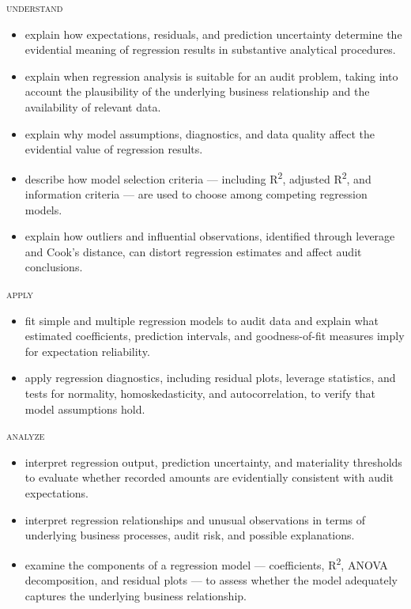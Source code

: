 \noindent \textsc{understand}
\begin{itemize}

\item explain how expectations, residuals, and prediction uncertainty determine the evidential meaning of regression results in substantive analytical procedures.
\item explain when regression analysis is suitable for an audit problem, taking into account the plausibility of the underlying business relationship and the availability of relevant data.
\item explain why model assumptions, diagnostics, and data quality affect the evidential value of regression results.
\item describe how model selection criteria --- including R\textsuperscript{2}, adjusted R\textsuperscript{2}, and information criteria --- are used to choose among competing regression models.
\item explain how outliers and influential observations, identified through leverage and Cook's distance, can distort regression estimates and affect audit conclusions.
\end{itemize}

\noindent \textsc{apply}
\begin{itemize}

\item fit simple and multiple regression models to audit data and explain what estimated coefficients, prediction intervals, and goodness-of-fit measures imply for expectation reliability.
\item apply regression diagnostics, including residual plots, leverage statistics, and tests for normality, homoskedasticity, and autocorrelation, to verify that model assumptions hold.
\end{itemize}

\noindent \textsc{analyze}
\begin{itemize}

\item interpret regression output, prediction uncertainty, and materiality thresholds to evaluate whether recorded amounts are evidentially consistent with audit expectations.
\item interpret regression relationships and unusual observations in terms of underlying business processes, audit risk, and possible explanations.
\item examine the components of a regression model --- coefficients, R\textsuperscript{2}, ANOVA decomposition, and residual plots --- to assess whether the model adequately captures the underlying business relationship.
\end{itemize}

